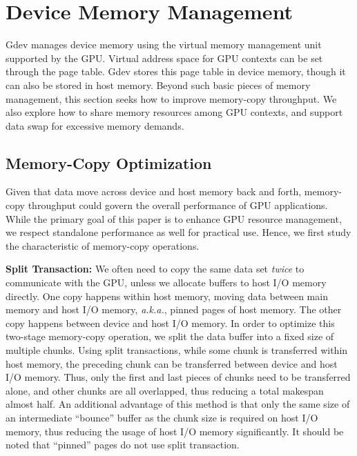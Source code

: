 \vspace{-0.25em}
\section{Device Memory Management}
\label{sec:memory_management}
\vspace{-0.25em}

Gdev manages device memory using the virtual memory management unit
supported by the GPU.
Virtual address space for GPU contexts can be set through the page
table.
Gdev stores this page table in device memory, though it can also be
stored in host memory.
Beyond such basic pieces of memory management, this section seeks how to
improve memory-copy throughput.
We also explore how to share memory resources among GPU contexts, and
support data swap for excessive memory demands.

\vspace{-0.25em}
\subsection{Memory-Copy Optimization}
\label{sec:memory_copy}
\vspace{-0.25em}

Given that data move across device and host memory back and forth,
memory-copy throughput could govern the overall performance of GPU
applications.
While the primary goal of this paper is to enhance GPU resource
management, we respect standalone performance as well for practical
use.
Hence, we first study the characteristic of memory-copy operations.

\textbf{Split Transaction:}
We often need to copy the same data set \textit{twice} to communicate with the
GPU, unless we allocate buffers to host I/O memory directly.
One copy happens within host memory, moving data between main memory
and host I/O memory, \textit{a.k.a.}, pinned pages of host memory.
The other copy happens between device and host I/O memory.
In order to optimize this two-stage memory-copy operation, we split the
data buffer into a fixed size of multiple chunks.
Using split transactions, while some chunk is transferred within host
memory, the preceding chunk can be transferred between device and host
I/O memory.
Thus, only the first and last pieces of chunks need to be
transferred alone, and other chunks are all overlapped, thus reducing a
total makespan almost half.
An additional advantage of this method is that only the same size of an
intermediate ``bounce'' buffer as the chunk size is required on host I/O
memory, thus reducing the usage of host I/O memory significantly.
It should be noted that ``pinned'' pages do not use split transaction.

